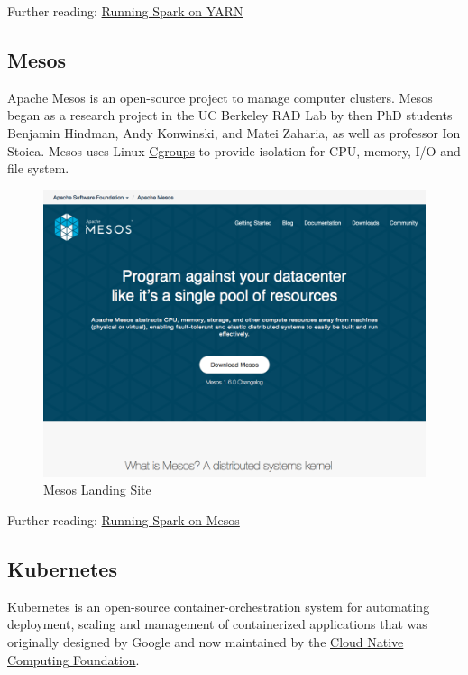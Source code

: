 \documentclass[]{book}
\theoremstyle{definition}
\theoremstyle{definition}
\theoremstyle{definition}
\theoremstyle{remark}
\begin{document}
Further reading:
\href{https://spark.apache.org/docs/latest/running-on-yarn.html}{Running
Spark on YARN}

\hypertarget{mesos}{%
\subsection{Mesos}\label{mesos}}

Apache Mesos is an open-source project to manage computer clusters.
Mesos began as a research project in the UC Berkeley RAD Lab by then PhD
students Benjamin Hindman, Andy Konwinski, and Matei Zaharia, as well as
professor Ion Stoica. Mesos uses Linux
\href{https://en.wikipedia.org/wiki/Cgroups}{Cgroups} to provide
isolation for CPU, memory, I/O and file system.

\begin{figure}

{\centering \includegraphics[width=13.78in]{images/05-clusters-mesos} 

}

\caption{Mesos Landing Site}\label{fig:mesos-spark}
\end{figure}

Further reading:
\href{https://spark.apache.org/docs/latest/running-on-mesos.html}{Running
Spark on Mesos}

\hypertarget{kubernetes}{%
\subsection{Kubernetes}\label{kubernetes}}

Kubernetes is an open-source container-orchestration system for
automating deployment, scaling and management of containerized
applications that was originally designed by Google and now maintained
by the \href{https://www.cncf.io/}{Cloud Native Computing Foundation}.
\end{document}
